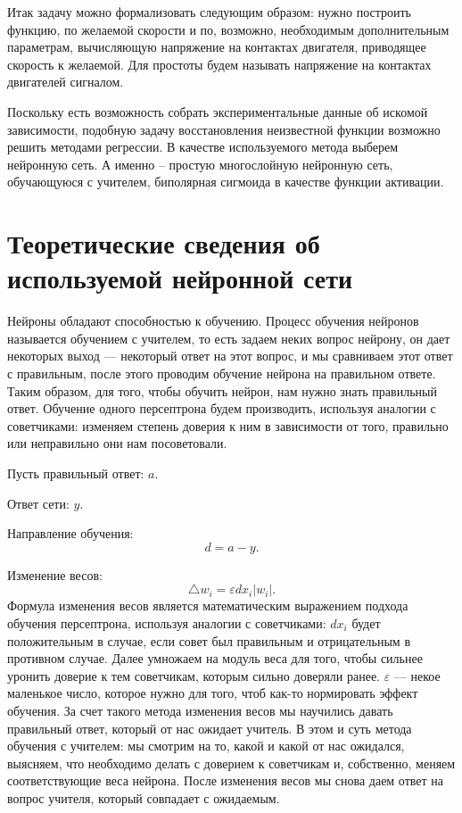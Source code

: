 \documentclass[14pt]{extreport}
\begin{document}
        Итак задачу можно формализовать следующим образом: нужно построить функцию, по желаемой скорости и по, возможно, необходимым дополнительным параметрам, вычисляющую напряжение на контактах двигателя, приводящее скорость к желаемой. Для простоты будем называть напряжение на контактах двигателей сигналом.

        Поскольку есть возможность собрать экспериментальные данные об искомой зависимости, подобную задачу восстановления неизвестной функции возможно решить методами регрессии. В качестве используемого метода выберем нейронную сеть. А именно -- простую многослойную нейронную сеть, обучающуюся с учителем, биполярная сигмоида в качестве функции активации.
\newpage
    \chapter{Теоретические сведения об используемой нейронной сети}
    Нейроны обладают способностью к обучению. Процесс обучения нейронов называется обучением с учителем, то есть задаем неких вопрос нейрону, он дает некоторых выход --- некоторый ответ на этот вопрос, и мы сравниваем этот ответ с правильным, после этого проводим обучение нейрона на правильном ответе. Таким образом, для того, чтобы обучить нейрон, нам нужно знать правильный ответ. Обучение одного персептрона будем производить, используя аналогии с советчиками: изменяем степень доверия к ним в зависимости от того, правильно или неправильно они нам посоветовали.

    Пусть правильный ответ: $a$.

    Ответ сети: $y$.

    Направление обучения: \[d = a - y.\]

    Изменение весов: \[\triangle w_i = \varepsilon d x_i |w_i|.\]
    Формула изменения весов является математическим выражением подхода обучения персептрона, используя аналогии с советчиками: $d x_i$ будет положительным в случае, если совет был правильным и отрицательным в противном случае. Далее умножаем на модуль веса для того, чтобы сильнее уронить доверие к тем советчикам, которым сильно доверяли ранее. $\varepsilon$ --- некое маленькое число, которое нужно для того, чтоб как-то нормировать эффект обучения. За счет такого метода изменения весов мы научились давать правильный ответ, который от нас ожидает учитель. В этом и суть метода обучения с учителем: мы смотрим на то, какой и какой от нас ожидался, выясняем, что необходимо делать с доверием к советчикам и, собственно, меняем соответствующие веса нейрона. После изменения весов мы снова даем ответ на вопрос учителя, который совпадает с ожидаемым.
\end{document}
